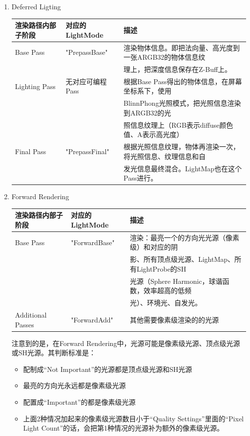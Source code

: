 \documentclass[9pt, b5paper]{article}
\begin{document}
\begin{enumerate}
\item Deferred Ligting
\label{sec:org60494cd}
\begin{center}
\begin{tabular}{lll}
\hline
渲染路径内部子阶段 & 对应的LightMode & 描述\\
\hline
Base Pass & "PrepassBase" & 渲染物体信息。即把法向量、高光度到一张ARGB32的物体信息纹\\
 &  & 理上，把深度信息保存在Z-Buff上。\\
\hline
Lighting Pass & 无对应可编程Pass & 根据Base Pass得出的物体信息，在屏幕坐标系下，使用\\
 &  & BlinnPhong光照模式，把光照信息渲染到ARGB32的光\\
 &  & 照信息纹理上（RGB表示diffuse颜色值、A表示高光度）\\
\hline
Final Pass & "PrepassFinal" & 根据光照信息纹理，物体再渲染一次，将光照信息、纹理信息和自\\
 &  & 发光信息最终混合。LightMap也在这个Pass进行。\\
\hline
\end{tabular}
\end{center}

\item Forward Rendering
\label{sec:orgfa4eb17}
\begin{center}
\begin{tabular}{lll}
\hline
渲染路径内部子阶段 & 对应的LightMode & 描述\\
\hline
Base Pass & "ForwardBase" & 渲染：最亮一个的方向光光源（像素级）和对应的阴\\
 &  & 影、所有顶点级光源、LightMap、所有LightProbe的SH\\
 &  & 光源（Sphere Harmonic，球谐函数，效率超高的低频\\
 &  & 光）、环境光、自发光。\\
\hline
Additional Passes & "ForwardAdd" & 其他需要像素级渲染的的光源\\
\hline
\end{tabular}
\end{center}

注意到的是，在Forward Rendering中，光源可能是像素级光源、顶点级光源或SH光源。其判断标准是：

\begin{itemize}
\item 配制成“Not Important”的光源都是顶点级光源和SH光源
\item 最亮的方向光永远都是像素级光源
\item 配置成“Important”的都是像素级光源
\item 上面2种情况加起来的像素级光源数目小于“Quality Settings”里面的“Pixel Light Count”的话，会把第1种情况的光源补为额外的像素级光源。
\end{itemize}


\end{enumerate}
\end{document}
